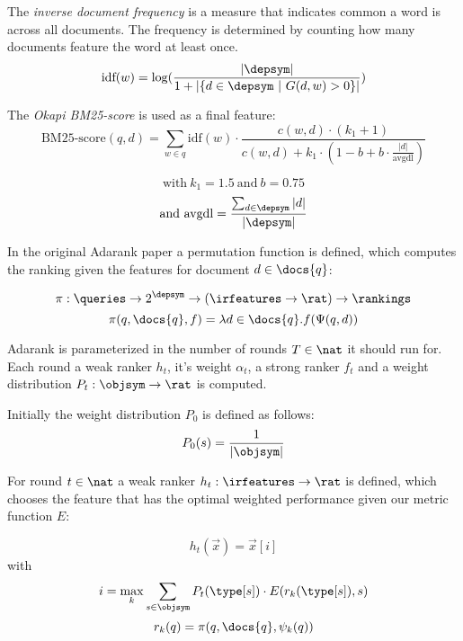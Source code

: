 \begin{definition} The \emph{inverse document frequency} is a measure that indicates
  common a word is across all documents.
  The frequency is determined by counting how many documents feature the word
  at least once.
  \[ \text{idf}(w) = \log(\frac{|\depsym|}{ 1 + \left| \{ d \in \depsym ~|~ G(d, w) > 0 \} \right|}) \]
\end{definition}

\begin{definition}
  The \emph{Okapi BM25-score} \cite{robertson1995okapi} is used as a final feature:
  \[
    \text{BM25-score}(q, d) = \sum_{w \in q} \text{idf}(w) \cdot
    \frac{c(w, d) \cdot (k_1 + 1)}
      {c(w, d) + k_1 \cdot (1 - b + b \cdot \frac{|d|}{\text{avgdl}} )}
  \]

  \[ \text{with}~ k_1 = 1.5 ~\text{and}~ b = 0.75 \]
  \[ \text{and}~ \text{avgdl} = \frac{ \sum_{d \in \depsym} |d| }{|\depsym|} \]
\end{definition}

\begin{definition}
  In the original Adarank paper \cite{xu2007adarank} a permutation function is defined,
  which computes the ranking given the features for document $d \in \docs{q}$:

  \[ \pi : \queries \rightarrow 2^\depsym \rightarrow (\irfeatures \rightarrow \rat) \rightarrow \rankings \]
  \[ \pi(q, \docs{q}, f) = \lambda d \in \docs{q} . f(\Psi(q, d)) \]
\end{definition}

Adarank is parameterized in the number of rounds $T \in \nat$ it should run for.
Each round a weak ranker $h_t$, it's weight $\alpha_t$, a strong ranker $f_t$
and a weight distribution $P_t : \objsym \rightarrow \rat$ is computed.

\begin{definition}
  Initially the weight distribution $P_0$ is defined as follows:
  $$ P_0(s) = \frac{1}{|\objsym|} $$
\end{definition}

\begin{definition}
  For round $t \in \nat$ a weak ranker $h_t : \irfeatures \rightarrow \rat$ is defined, which chooses the feature
  that has the optimal weighted performance given our metric function $E$:

  $$ h_t(\vec{x}) = \vec{x}[i] $$
  with $$ i = \max_k \sum_{s \in \objsym} P_t(\type[s]) \cdot E(r_k(\type[s]), s) $$
  $$ r_k(q) = \pi(q, \docs{q}, \psi_k(q)) $$
\end{definition}


